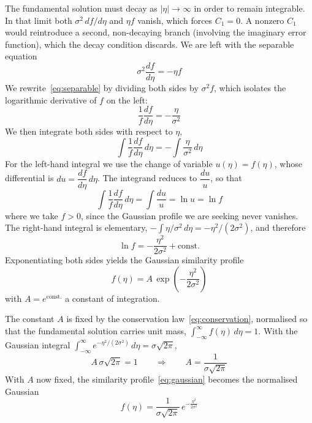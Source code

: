 \documentclass[a4paper,12pt]{article}
\numberwithin{equation}{section}
\begin{document}
The fundamental solution must decay as $|\eta|\to\infty$ in order to remain
integrable. In that limit both $\sigma^{2}\,df/d\eta$ and $\eta f$ vanish, which
forces $C_{1} = 0$. A nonzero $C_1$ would reintroduce a second, non-decaying branch (involving the imaginary error function), which the decay condition discards. We are left with the separable
equation
\begin{equation}\label{eq:separable}
  \sigma^{2}\frac{df}{d\eta} = -\eta f 
\end{equation}
We rewrite~\eqref{eq:separable} by dividing both sides by $\sigma^{2} f$, which
isolates the logarithmic derivative of $f$ on the left:
\begin{equation}\label{eq:logderiv}
  \frac{1}{f}\frac{df}{d\eta} = -\frac{\eta}{\sigma^{2}} 
\end{equation}
We then integrate both sides with respect to $\eta$,
\begin{equation}\label{eq:integrate}
  \int \frac{1}{f}\frac{df}{d\eta}\,d\eta
    = -\int \frac{\eta}{\sigma^{2}}\,d\eta 
\end{equation}
For the left-hand integral we use the change of variable $u(\eta) = f(\eta)$,
whose differential is $du = \dfrac{df}{d\eta}\,d\eta$. The integrand reduces to
$\dfrac{du}{u}$, so that
\begin{equation}\label{eq:lnf}
  \int \frac{1}{f}\frac{df}{d\eta}\,d\eta
    = \int \frac{du}{u}
    = \ln u
    = \ln f 
\end{equation}
where we take $f > 0$, since the Gaussian profile we are seeking never vanishes.
The right-hand integral is elementary, $-\int \eta/\sigma^{2}\,d\eta
= -\eta^{2}/(2\sigma^{2})$, and therefore
\begin{equation}\label{eq:lnsol}
  \ln f = -\frac{\eta^{2}}{2\sigma^{2}} + \mathrm{const} .
\end{equation}
Exponentiating both sides yields the Gaussian similarity profile
\begin{equation}\label{eq:gaussian}
  f(\eta) = A\,\exp\!\left(-\frac{\eta^{2}}{2\sigma^{2}}\right) 
\end{equation}
with $A = e^{\text{const.}}$ a constant of integration.

The constant $A$ is fixed by the conservation law~\eqref{eq:conservation},
normalised so that the fundamental solution carries unit mass,
$\int_{-\infty}^{\infty} f(\eta)\,d\eta = 1$. With the Gaussian integral
$\int_{-\infty}^{\infty} e^{-\eta^{2}/(2\sigma^{2})}\,d\eta = \sigma\sqrt{2\pi}$,
\begin{equation}\label{eq:Anorm}
  A\,\sigma\sqrt{2\pi} = 1
  \qquad\Longrightarrow\qquad
  A = \frac{1}{\sigma\sqrt{2\pi}}
\end{equation}
With $A$ now fixed, the similarity profile~\eqref{eq:gaussian} becomes the
normalised Gaussian
\begin{equation}\label{eq:gaussian-norm}
  f(\eta) = \frac{1}{\sigma\sqrt{2\pi}}\,e^{-\frac{\eta^2}{2\sigma^2}}
\end{equation}
\end{document}
